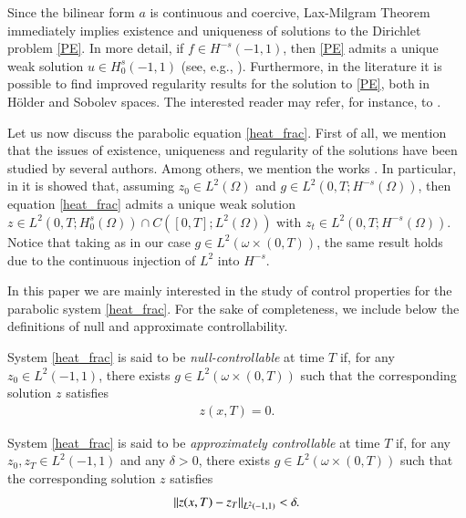 Since the bilinear form $a$ is continuous and coercive, Lax-Milgram Theorem immediately implies existence and uniqueness of solutions to the Dirichlet problem \eqref{PE}. In more detail, if $f\in H^{-s}(-1,1)$, then \eqref{PE} admits a unique weak solution $u\in H_0^s(-1,1)$ (see, e.g., \cite[Proposition 2.1]{biccari2017local}). Furthermore, in the literature it is possible to find improved regularity results for the solution to \eqref{PE}, both in H\"older and Sobolev spaces. The interested reader may refer, for instance, to \cite{acosta2017fractional,biccari2017local,leonori2015basic,ros2014dirichlet,ros2014extremal}.

Let us now discuss the parabolic equation \eqref{heat_frac}. First of all, we mention that the issues of existence, uniqueness and regularity of the solutions have been studied by several authors. Among others, we mention the works \cite{biccari2017parabolic,fernandez2016boundary,leonori2015basic}. In particular, in \cite[Theorem 26]{leonori2015basic} it is showed that, assuming $z_0\in L^2(\Omega)$ and $g\in L^2(0,T;H^{-s}(\Omega))$, then equation \eqref{heat_frac} admits a unique weak solution $z\in L^2(0,T;H_0^s(\Omega))\cap C([0,T];L^2(\Omega))$ with $z_t\in L^2(0,T;H^{-s}(\Omega))$. Notice that taking as in our case $g\in L^2(\omega\times(0,T))$, the same result holds due to the continuous injection of $L^2$ into $H^{-s}$.

In this paper we are mainly interested in the study of control properties for the parabolic system \eqref{heat_frac}. For the sake of completeness, we include below the definitions of null and approximate controllability.

\begin{definition}
	System \eqref{heat_frac} is said to be \textit{null-controllable} at time $T$ if, for any $z_0\in L^2(-1,1)$, there exists $g\in L^2(\omega\times(0,T))$ such that the corresponding solution $z$ satisfies 
	\begin{align*}
		z(x,T)=0.
	\end{align*}
\end{definition}

\begin{definition}
	System \eqref{heat_frac} is said to be \textit{approximately controllable} at time $T$ if, for any $z_0,z_T\in L^2(-1,1)$ and any $\delta>0$, there exists $g\in L^2(\omega\times(0,T))$ such that the corresponding solution $z$ satisfies \begin{align*}
		{\left\|z(x,T)-z_T\right\|}_{L^2(-1,1)}<\delta.
	\end{align*}
\end{definition}


